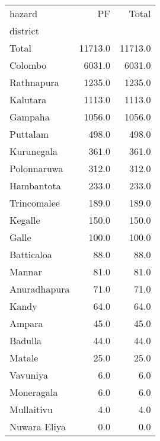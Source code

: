 \begin{tabular}{lrr}
\toprule
hazard &       PF &    Total \\
district     &          &          \\
\midrule
Total        &  11713.0 &  11713.0 \\
Colombo      &   6031.0 &   6031.0 \\
Rathnapura   &   1235.0 &   1235.0 \\
Kalutara     &   1113.0 &   1113.0 \\
Gampaha      &   1056.0 &   1056.0 \\
Puttalam     &    498.0 &    498.0 \\
Kurunegala   &    361.0 &    361.0 \\
Polonnaruwa  &    312.0 &    312.0 \\
Hambantota   &    233.0 &    233.0 \\
Trincomalee  &    189.0 &    189.0 \\
Kegalle      &    150.0 &    150.0 \\
Galle        &    100.0 &    100.0 \\
Batticaloa   &     88.0 &     88.0 \\
Mannar       &     81.0 &     81.0 \\
Anuradhapura &     71.0 &     71.0 \\
Kandy        &     64.0 &     64.0 \\
Ampara       &     45.0 &     45.0 \\
Badulla      &     44.0 &     44.0 \\
Matale       &     25.0 &     25.0 \\
Vavuniya     &      6.0 &      6.0 \\
Moneragala   &      6.0 &      6.0 \\
Mullaitivu   &      4.0 &      4.0 \\
Nuwara Eliya &      0.0 &      0.0 \\
\bottomrule
\end{tabular}
